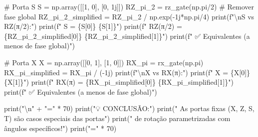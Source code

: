 \documentclass[
  brazilian,
]{report}
\newenvironment{Shaded}{\begin{snugshade}}{\end{snugshade}}
\newcommand{\NormalTok}[1]{\textcolor[rgb]{0.00,0.23,0.31}{#1}}
\begin{document}
\begin{Shaded}
\begin{Highlighting}[]
\NormalTok{\# Porta S}
\NormalTok{S = np.array([[1, 0], [0, 1j]])}
\NormalTok{RZ\_pi\_2 = rz\_gate(np.pi/2)}
\NormalTok{\# Remover fase global}
\NormalTok{RZ\_pi\_2\_simplified = RZ\_pi\_2 / np.exp({-}1j*np.pi/4)}
\NormalTok{print(f"\textbackslash{}nS vs RZ(π/2):")}
\NormalTok{print(f"  S =       \{S[0]\}  \{S[1]\}")}
\NormalTok{print(f"  RZ(π/2) = \{RZ\_pi\_2\_simplified[0]\}  \{RZ\_pi\_2\_simplified[1]\}")}
\NormalTok{print(f"  ✅ Equivalentes (a menos de fase global)")}

\NormalTok{\# Porta X}
\NormalTok{X = np.array([[0, 1], [1, 0]])}
\NormalTok{RX\_pi = rx\_gate(np.pi)}
\NormalTok{RX\_pi\_simplified = RX\_pi / ({-}1j)}
\NormalTok{print(f"\textbackslash{}nX vs RX(π):")}
\NormalTok{print(f"  X =     \{X[0]\}  \{X[1]\}")}
\NormalTok{print(f"  RX(π) = \{RX\_pi\_simplified[0]\}  \{RX\_pi\_simplified[1]\}")}
\NormalTok{print(f"  ✅ Equivalentes (a menos de fase global)")}

\NormalTok{print("\textbackslash{}n" + "=" * 70)}
\NormalTok{print("💡 CONCLUSÃO:")}
\NormalTok{print("   As portas fixas (X, Z, S, T) são casos especiais das portas")}
\NormalTok{print("   de rotação parametrizadas com ângulos específicos!")}
\NormalTok{print("=" * 70)}
\end{Highlighting}
\end{Shaded}
\end{document}
